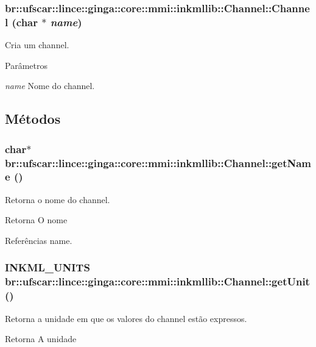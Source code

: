 \subsubsection[{Channel}]{\setlength{\rightskip}{0pt plus 5cm}br::ufscar::lince::ginga::core::mmi::inkmllib::Channel::Channel (char $\ast$ {\em name})}\label{classbr_1_1ufscar_1_1lince_1_1ginga_1_1core_1_1mmi_1_1inkmllib_1_1Channel_ad5a623c7eaf864aa70975dd68fc3f92c}
Cria um channel. 
\begin{DoxyParams}{Parâmetros}
\item[{\em name}]Nome do channel. \end{DoxyParams}


\subsection{Métodos}
\subsubsection[{getName}]{\setlength{\rightskip}{0pt plus 5cm}char$\ast$ br::ufscar::lince::ginga::core::mmi::inkmllib::Channel::getName ()\hspace{0.3cm}{\ttfamily  [inline]}}\label{classbr_1_1ufscar_1_1lince_1_1ginga_1_1core_1_1mmi_1_1inkmllib_1_1Channel_a37739476bcdd2f22c8bc003e414ce463}
Retorna o nome do channel. \begin{DoxyReturn}{Retorna}
O nome 
\end{DoxyReturn}


Referências name.

\subsubsection[{getUnit}]{\setlength{\rightskip}{0pt plus 5cm}INKML\_\-UNITS br::ufscar::lince::ginga::core::mmi::inkmllib::Channel::getUnit ()\hspace{0.3cm}{\ttfamily  [inline]}}\label{classbr_1_1ufscar_1_1lince_1_1ginga_1_1core_1_1mmi_1_1inkmllib_1_1Channel_afefeeb319bedbc32dd9fe11a170e532f}
Retorna a unidade em que os valores do channel estão expressos. \begin{DoxyReturn}{Retorna}
A unidade 
\end{DoxyReturn}


